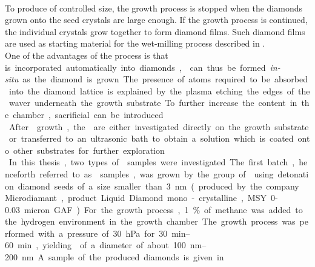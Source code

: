 	\\
	To produce \nds of controlled size, the growth process is stopped when the diamonds grown onto the seed crystals are large enough.
	If the growth process is continued, the individual crystals grow together to form diamond films.
	Such diamond films are used as starting material for the wet-milling process described in .
	\\
	One of the advantages of the \CVD process is that \si is incorporated automatically into diamonds, \sivs can thus be formed \textit{in-situ} as the diamond is grown. The presence of \si atoms required to be absorbed into the diamond lattice is explained by the plasma etching the edges of the \si waver underneath the growth substrate.
	To further increase the \si content in the chamber, sacrificial \si can be introduced.
	\\
	After \nd growth, the \nds are either investigated directly on the growth substrate or transferred to an ultrasonic bath to obtain a solution which is coated onto other substrates for further exploration.
	\\
	In this thesis, two types of \nds samples were investigated.
	The first batch, henceforth referred to as \CVD samples, was grown by the group of \schreck using detonation diamond seeds of a size smaller than \SI{3}{nm}(produced by the company Microdiamant, product Liquid Diamond mono-crystalline, MSY {0-0.03} micron GAF).
	For the growth process, \SI{1}{\percent} of methane was added to the hydrogen environment in the growth chamber.
	The growth process was performed with a pressure of \SI{30}{hPa} for \SIrange{30}{60}{min}, yielding \nds of a diameter of about \SIrange{100}{200}{nm}. A sample of the produced diamonds is given in .
	\\

